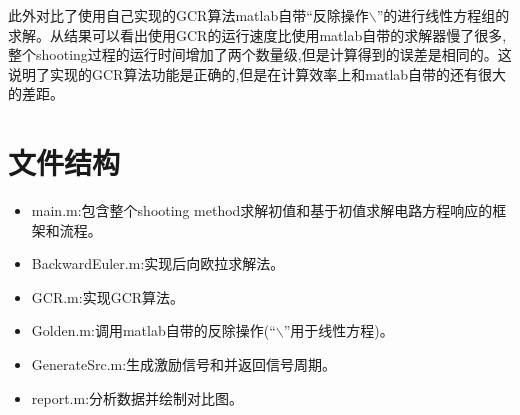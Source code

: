 \documentclass[12pt]{article}
\begin{document}
\begin{sloppypar}
\qquad 此外对比了使用自己实现的GCR算法matlab自带“反除操作$\backslash$”的进行线性方程组的求解。从结果可以看出使用GCR的运行速度比使用matlab自带的求解器慢了很多,整个shooting过程的运行时间增加了两个数量级,但是计算得到的误差是相同的。这说明了实现的GCR算法功能是正确的,但是在计算效率上和matlab自带的还有很大的差距。

\section{文件结构}
\begin{itemize}
  \item main.m:包含整个shooting method求解初值和基于初值求解电路方程响应的框架和流程。
  \item BackwardEuler.m:实现后向欧拉求解法。
  \item GCR.m:实现GCR算法。
  \item Golden.m:调用matlab自带的反除操作(“$\backslash$”用于线性方程)。
  \item GenerateSrc.m:生成激励信号和并返回信号周期。
  \item report.m:分析数据并绘制对比图。
\end{itemize}

\end{sloppypar}
\end{document}
